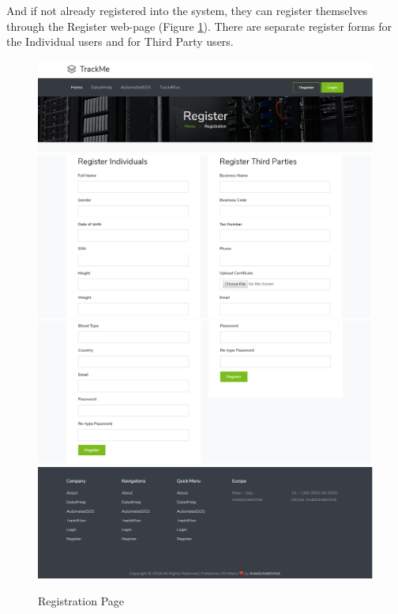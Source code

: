 \documentclass[a4paper, hidelinks, 12pt]{report}
\begin{document}
	 And if not already registered into the system, they can register themselves through the Register web-page (Figure \ref{fig:Registration}). There are separate register forms for the Individual users and for Third Party users.
	 \begin{figure}[H]
		\centering
		\includegraphics[scale=0.35]{UI/register1.png}
		\includegraphics[scale=0.35]{UI/register2.png}
		\includegraphics[scale=0.35]{UI/register3.png}
		\includegraphics[scale=0.35]{UI/d4h_home4.png}
		\caption[UI: Registration Page]{Registration Page}
		\label{fig:Registration}
	\end{figure}
\end{document}
